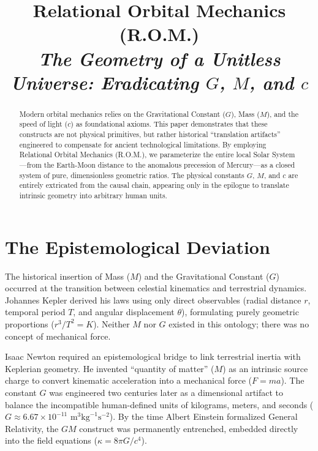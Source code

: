 \documentclass[11pt, a4paper]{article}
\title{\textbf{Relational Orbital Mechanics (R.O.M.)} \\
\large \textit{The Geometry of a Unitless Universe: Eradicating $G$, $M$, and $c$}}
\author{}
\date{}
\begin{document}
\maketitle

\begin{abstract}
Modern orbital mechanics relies on the Gravitational Constant ($G$), Mass ($M$), and the speed of light ($c$) as foundational axioms. This paper demonstrates that these constructs are not physical primitives, but rather historical ``translation artifacts'' engineered to compensate for ancient technological limitations. By employing Relational Orbital Mechanics (R.O.M.), we parameterize the entire local Solar System---from the Earth-Moon distance to the anomalous precession of Mercury---as a closed system of pure, dimensionless geometric ratios. The physical constants $G$, $M$, and $c$ are entirely extricated from the causal chain, appearing only in the epilogue to translate intrinsic geometry into arbitrary human units.
\end{abstract}

\vspace{0.5cm}

\section{The Epistemological Deviation}
The historical insertion of Mass ($M$) and the Gravitational Constant ($G$) occurred at the transition between celestial kinematics and terrestrial dynamics. Johannes Kepler derived his laws using only direct observables (radial distance $r$, temporal period $T$, and angular displacement $\theta$), formulating purely geometric proportions ($r^3/T^2 = K$). Neither $M$ nor $G$ existed in this ontology; there was no concept of mechanical force.

Isaac Newton required an epistemological bridge to link terrestrial inertia with Keplerian geometry. He invented ``quantity of matter'' ($M$) as an intrinsic source charge to convert kinematic acceleration into a mechanical force ($F = ma$). The constant $G$ was engineered two centuries later as a dimensional artifact to balance the incompatible human-defined units of kilograms, meters, and seconds ($G \approx 6.67 \times 10^{-11} \text{ m}^3\text{kg}^{-1}\text{s}^{-2}$). By the time Albert Einstein formalized General Relativity, the $GM$ construct was permanently entrenched, embedded directly into the field equations ($\kappa = 8\pi G / c^4$).

\end{document}
